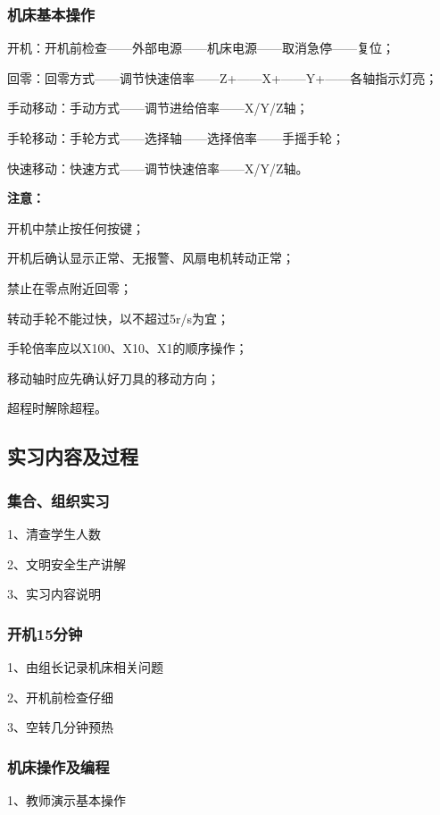 \subsubsection{机床基本操作}
\begin{compactenum}[1、]
\item 开机：开机前检查——外部电源——机床电源——取消急停——复位；
\item 回零：回零方式——调节快速倍率——Z+——X+——Y+——各轴指示灯亮；
\item 手动移动：手动方式——调节进给倍率——X/Y/Z轴；
\item 手轮移动：手轮方式——选择轴——选择倍率——手摇手轮；
\item 快速移动：快速方式——调节快速倍率——X/Y/Z轴。
\end{compactenum}
\textbf{注意：}
\begin{compactenum}[1、]
\item 开机中禁止按任何按键；
\item 开机后确认显示正常、无报警、风扇电机转动正常；
\item 禁止在零点附近回零；
\item 转动手轮不能过快，以不超过5r/s为宜；
\item 手轮倍率应以X100、X10、X1的顺序操作；
\item 移动轴时应先确认好刀具的移动方向；
\item 超程时解除超程。
\end{compactenum}

\subsection{实习内容及过程}

\subsubsection{集合、组织实习}
1、清查学生人数

2、文明安全生产讲解

3、实习内容说明
\subsubsection{开机15分钟}
1、由组长记录机床相关问题

2、开机前检查仔细

3、空转几分钟预热
\subsubsection{机床操作及编程}
1、教师演示基本操作

